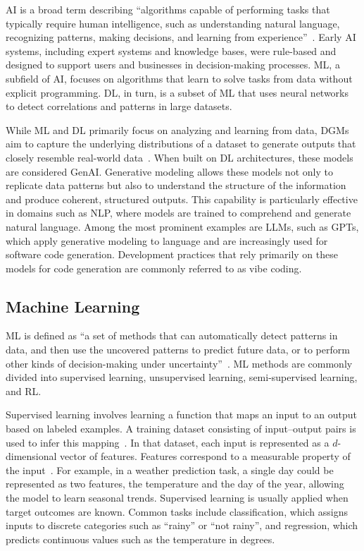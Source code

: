 \documentclass[
english,                 %
bibtex,                  %
]{kththesis}
\numberwithin{listing}{chapter}
\begin{document}
\Gls{AI} is a broad term describing “algorithms capable of performing tasks that typically require human intelligence, such as understanding natural language, recognizing patterns, making decisions, and learning from experience”~\cite{banh_generative_2023}. Early \gls{AI} systems, including expert systems and knowledge bases, were rule-based and designed to support users and businesses in decision-making processes. \Gls{ML}, a subfield of \gls{AI}, focuses on algorithms that learn to solve tasks from data without explicit programming. \Gls{DL}, in turn, is a subset of \gls{ML} that uses neural networks to detect correlations and patterns in large datasets.

While \gls{ML} and \gls{DL} primarily focus on analyzing and learning from data, \glspl{DGM} aim to capture the underlying distributions of a dataset to generate outputs that closely resemble real-world data~\cite{banh_generative_2023}. When built on \gls{DL} architectures, these models are considered \gls{GenAI}. Generative modeling allows these models not only to replicate data patterns but also to understand the structure of the information and produce coherent, structured outputs. This capability is particularly effective in domains such as \gls{NLP}, where models are trained to comprehend and generate natural language. Among the most prominent examples are \glspl{LLM}, such as \glspl{GPT}, which apply generative modeling to language and are increasingly used for software code generation. Development practices that rely primarily on these models for code generation are commonly referred to as vibe coding.

\subsection{Machine Learning}
\glsresetall
\label{sec:bg_ml}

\Gls{ML} is defined as ``a set of methods that can automatically detect patterns in data, and then use the uncovered patterns to predict future data, or to perform other kinds of decision-making under uncertainty''~\cite{murphy_machine_2013}. \Gls{ML} methods are commonly divided into supervised learning, unsupervised learning, semi-supervised learning, and \gls{RL}.

Supervised learning involves learning a function that maps an input to an output based on labeled examples. A training dataset consisting of input–output pairs is used to infer this mapping~\cite{sarker_machine_2021}. In that dataset, each input is represented as a $d$-dimensional vector of features. Features correspond to a measurable property of the input~\cite{murphy_machine_2013}. For example, in a weather prediction task, a single day could be represented as two features, the temperature and the day of the year, allowing the model to learn seasonal trends. Supervised learning is usually applied when target outcomes are known. Common tasks include classification, which assigns inputs to discrete categories such as ``rainy'' or ``not rainy'', and regression, which predicts continuous values such as the temperature in degrees.
\end{document}
